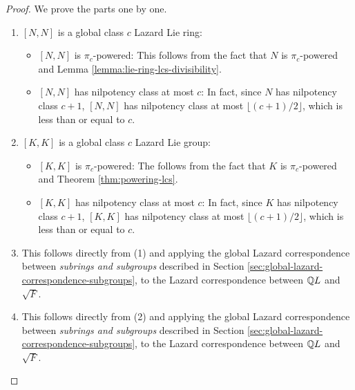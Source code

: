 \begin{proof}
  We prove the parts one by one.

  \begin{enumerate}
  \item $[N,N]$ is a global class $c$ Lazard Lie ring: 
    \begin{itemize}
    \item $[N,N]$ is $\pi_c$-powered: This follows from the fact that
      $N$ is $\pi_c$-powered and Lemma
      \ref{lemma:lie-ring-lcs-divisibility}.
    \item $[N,N]$ has nilpotency class at most $c$: In fact, since $N$
      has nilpotency class $c + 1$, $[N,N]$ has nilpotency class at
      most $\lfloor (c + 1)/2 \rfloor$, which is less than or equal to
      $c$.
    \end{itemize}
  \item $[K,K]$ is a global class $c$ Lazard Lie group:
    
    \begin{itemize}
    \item $[K,K]$ is $\pi_c$-powered: The follows from the fact that
      $K$ is $\pi_c$-powered and Theorem \ref{thm:powering-lcs}.
    \item $[K,K]$ has nilpotency class at most $c$: In fact, since $K$
      has nilpotency class $c + 1$, $[K,K]$ has nilpotency class at
      most $\lfloor (c + 1)/2 \rfloor$, which is less than or equal to
      $c$.
    \end{itemize}

  \item This follows directly from (1) and applying the global Lazard
    correspondence between {\em subrings and subgroups} described in
    Section \ref{sec:global-lazard-correspondence-subgroups}, to the
    Lazard correspondence between $\mathbb{Q} L$ and $\sqrt{F}$.
  \item This follows directly from (2) and applying the global Lazard
    correspondence between {\em subrings and subgroups} described in
    Section \ref{sec:global-lazard-correspondence-subgroups}, to the
    Lazard correspondence between $\mathbb{Q} L$ and $\sqrt{F}$.
  \end{enumerate}
\end{proof}

